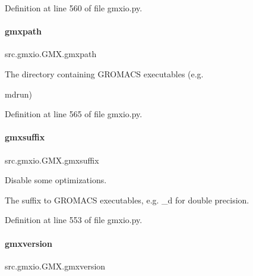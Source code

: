 Definition at line 560 of file gmxio.\+py.

\mbox{\label{classsrc_1_1gmxio_1_1GMX_a28ec53794f4ef9449e39029677e5114c}} 
\paragraph{\texorpdfstring{gmxpath}{gmxpath}}
{\footnotesize\ttfamily src.\+gmxio.\+G\+M\+X.\+gmxpath}



The directory containing G\+R\+O\+M\+A\+CS executables (e.\+g. 

mdrun) 

Definition at line 565 of file gmxio.\+py.

\mbox{\label{classsrc_1_1gmxio_1_1GMX_a0a5328567ebce344ddc08d82789b2d01}} 
\paragraph{\texorpdfstring{gmxsuffix}{gmxsuffix}}
{\footnotesize\ttfamily src.\+gmxio.\+G\+M\+X.\+gmxsuffix}



Disable some optimizations. 

The suffix to G\+R\+O\+M\+A\+CS executables, e.\+g. \textquotesingle{}\+\_\+d\textquotesingle{} for double precision. 

Definition at line 553 of file gmxio.\+py.

\mbox{\label{classsrc_1_1gmxio_1_1GMX_a8c2ec3cee34d56ee3e77d60990a8185e}} 
\paragraph{\texorpdfstring{gmxversion}{gmxversion}}
{\footnotesize\ttfamily src.\+gmxio.\+G\+M\+X.\+gmxversion}



